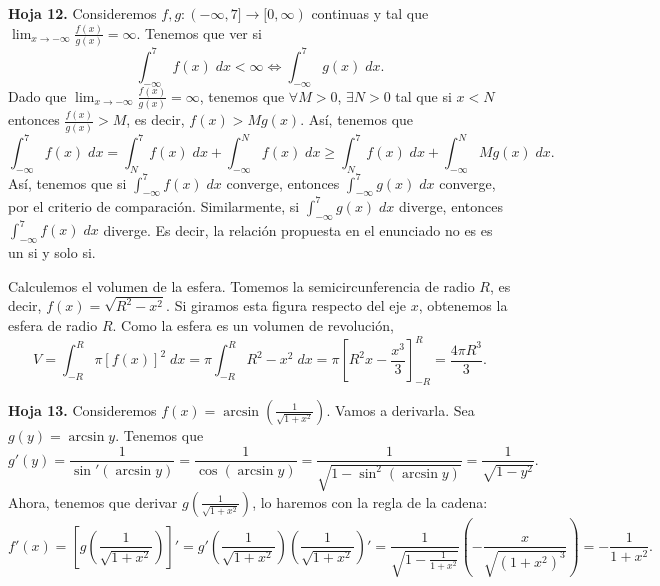 \begin{eg}
	\normalfont \textbf{Hoja 12.} Consideremos $\displaystyle f,g : (-\infty,7] \to [0,\infty) $ continuas y tal que $\displaystyle \lim_{x \to -\infty}\frac{f\left(x\right)}{g\left(x\right)} =\infty  $. Tenemos que ver si 
	\[ \int^{7}_{-\infty} f\left(x\right) \; dx < \infty \iff \int^{7}_{-\infty} g\left(x\right) \; dx .\]
	Dado que $\displaystyle \lim_{x \to -\infty}\frac{f\left(x\right)}{g\left(x\right)} = \infty $, tenemos que $\displaystyle \forall M > 0 $, $\displaystyle \exists N > 0 $ tal que si $\displaystyle x < N $ entonces $\displaystyle \frac{f\left(x\right)}{g\left(x\right)} > M $, es decir, $\displaystyle f\left(x\right) > Mg\left(x\right) $. Así, tenemos que
	\[\int^{7}_{-\infty} f\left(x\right) \; dx = \int^{7}_{N} f\left(x\right) \; dx + \int^{N}_{-\infty} f\left(x\right) \; dx \geq \int^{7}_{N} f\left(x\right) \; dx + \int^{N}_{-\infty} Mg\left(x\right) \; dx .\]
	Así, tenemos que si $\displaystyle \int^{7}_{-\infty} f\left(x\right) \; dx $ converge, entonces $\displaystyle \int^{7}_{-\infty} g\left(x\right) \; dx $ converge, por el criterio de comparación. Similarmente, si $\displaystyle \int^{7}_{-\infty} g\left(x\right) \; dx $ diverge, entonces $\displaystyle \int^{7}_{-\infty} f\left(x\right) \; dx $ diverge. Es decir, la relación propuesta en el enunciado no es es un si y solo si.
\end{eg}
\begin{eg}
\normalfont Calculemos el volumen de la esfera. Tomemos la semicircunferencia de radio $\displaystyle R $, es decir, $\displaystyle f\left(x\right) = \sqrt{R^{2}-x^{2}} $. Si giramos esta figura respecto del eje $\displaystyle x $, obtenemos la esfera de radio $\displaystyle R $. Como la esfera es un volumen de revolución,
\[V = \int^{R}_{-R} \pi [f\left(x\right)]^{2} \; dx =\pi \int^{R}_{-R} R^{2}-x^{2} \; dx = \pi \left[R^{2}x - \frac{x^{3}}{3}\right] ^{R}_{-R} = \frac{4\pi R^{3}}{3} .\]
\end{eg}
\begin{eg}
\normalfont \textbf{Hoja 13.} Consideremos $\displaystyle f\left(x\right) = \arcsin\left(\frac{1}{\sqrt{1 + x^{2}}}\right) $. Vamos a derivarla. Sea $\displaystyle g\left(y\right) = \arcsin y $. Tenemos que 
\[g'\left(y\right) = \frac{1}{\sin'\left(\arcsin y\right)} = \frac{1}{\cos\left(\arcsin y\right)} = \frac{1}{\sqrt{1 - \sin ^{2}\left(\arcsin y\right)}} = \frac{1}{\sqrt{1-y^{2}}} .\]
Ahora, tenemos que derivar $\displaystyle g\left(\frac{1}{\sqrt{1 + x^{2}}}\right) $, lo haremos con la regla de la cadena:
	\[ f'\left(x\right) = \left[g\left(\frac{1}{\sqrt{1 + x^{2}}}\right)\right] ' = g'\left(\frac{1}{\sqrt{1 + x^{2}}}\right)\left(\frac{1}{\sqrt{1 + x^{2}}}\right)' = \frac{1}{\sqrt{1 - \frac{1}{1+x^{2}}}}\left(-\frac{x}{\sqrt{\left(1+x^{2}\right)^{3}}}\right) = -\frac{1}{1+x^{2}}.\]
\end{eg}
